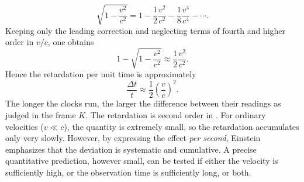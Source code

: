 \documentclass[submitted,12pt]{article}
\begin{document}
\begin{equation*}
\sqrt{1-\frac{v^{2}}{c^{2}}}
=
1-\frac{1}{2}\frac{v^{2}}{c^{2}}
-\frac{1}{8}\frac{v^{4}}{c^{4}}
-\cdots .
\end{equation*}
%
Keeping only the leading correction and neglecting terms of fourth and higher order in $v/c$, one obtains
\begin{equation*}
1-\sqrt{1-\frac{v^{2}}{c^{2}}}
\approx
\frac{1}{2}\frac{v^{2}}{c^{2}} .
\end{equation*}
%
Hence the retardation per unit time is approximately
%
\begin{equation*}
\frac{\Delta t}{t}
\approx
\frac{1}{2}\left(\frac{v}{c}\right)^{2}.
\end{equation*}
%
The longer the clocks run, the larger the difference between their readings as judged in the frame $K$. The retardation is second order in \betafactorh. For ordinary velocities ($v\ll c$), the quantity \betafactorsquaredh is extremely small, so the retardation accumulates only very slowly. However, by expressing the effect \emph{per second}, Einstein emphasizes that the deviation is systematic and cumulative. A precise quantitative prediction, however small, can be tested if either the velocity is sufficiently high, or the observation time is sufficiently long, or both.

\end{document}
